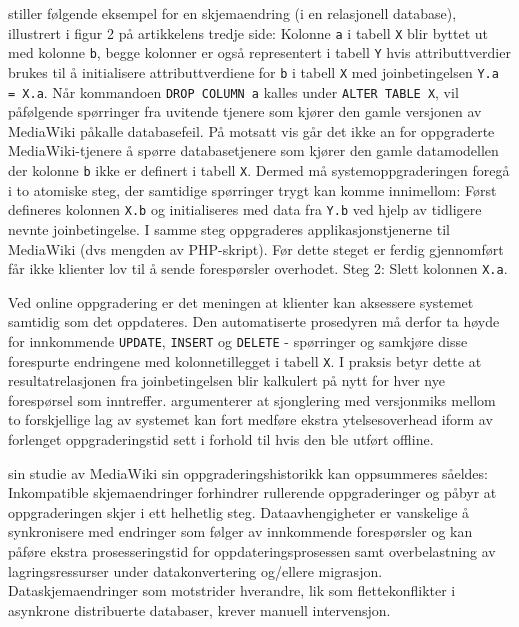 \cite{dumitras2009nodowntime} stiller følgende eksempel for en skjemaendring (i en relasjonell database), illustrert i figur 2 på artikkelens tredje side: Kolonne \texttt{a} i tabell \texttt{X} blir byttet ut med kolonne \texttt{b}, begge kolonner er også representert i tabell \texttt{Y} hvis attributtverdier brukes til å initialisere attributtverdiene for \texttt{b} i tabell \texttt{X} med joinbetingelsen \texttt{Y.a = X.a}. Når kommandoen \texttt{DROP COLUMN a} kalles under \texttt{ALTER TABLE X}, vil påfølgende spørringer fra uvitende tjenere som kjører den gamle versjonen av MediaWiki påkalle databasefeil. På motsatt vis går det ikke an for oppgraderte MediaWiki-tjenere å spørre databasetjenere som kjører den gamle datamodellen der kolonne \texttt{b} ikke er definert i tabell \texttt{X}. Dermed må systemoppgraderingen foregå i to atomiske steg, der samtidige spørringer trygt kan komme innimellom: Først defineres kolonnen \texttt{X.b} og initialiseres med data fra \texttt{Y.b} ved hjelp av tidligere nevnte joinbetingelse. I samme steg oppgraderes applikasjonstjenerne til MediaWiki (dvs mengden av PHP-skript). Før dette steget er ferdig gjennomført får ikke klienter lov til å sende forespørsler overhodet. Steg 2: Slett kolonnen \texttt{X.a}.

Ved online oppgradering er det meningen at klienter kan aksessere systemet samtidig som det oppdateres. Den automatiserte prosedyren må derfor ta høyde for innkommende \texttt{UPDATE}, \texttt{INSERT} og \texttt{DELETE} - spørringer og samkjøre disse forespurte endringene med kolonnetillegget i tabell \texttt{X}. I praksis betyr dette at resultatrelasjonen fra joinbetingelsen blir kalkulert på nytt for hver nye forespørsel som inntreffer. \cite{dumitras2009nodowntime} argumenterer at sjonglering med versjonmiks mellom to forskjellige lag av systemet kan fort medføre ekstra ytelsesoverhead iform av forlenget oppgraderingstid sett i forhold til hvis den ble utført offline.

\cite{dumitras2009nodowntime} sin studie av MediaWiki sin oppgraderingshistorikk kan oppsummeres såeldes: Inkompatible skjemaendringer forhindrer rullerende oppgraderinger og påbyr at oppgraderingen skjer i ett helhetlig steg. Dataavhengigheter er vanskelige å synkronisere med endringer som følger av innkommende forespørsler og kan påføre ekstra prosesseringstid for oppdateringsprosessen samt overbelastning av lagringsressurser under datakonvertering og/ellere migrasjon. Dataskjemaendringer som motstrider hverandre, lik som flettekonflikter i asynkrone distribuerte databaser, krever manuell intervensjon.

